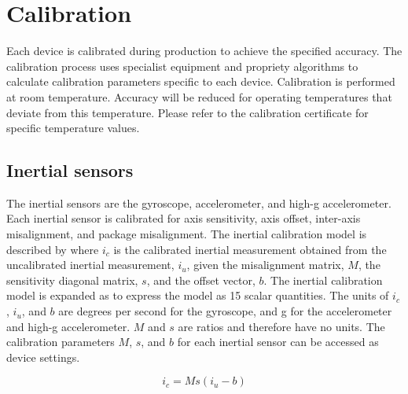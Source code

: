 \section{Calibration}
\label{sec:calibration}

Each device is calibrated during production to achieve the specified accuracy.  The calibration process uses specialist equipment and propriety algorithms to calculate calibration parameters specific to each device.
 Calibration is performed at room temperature.  Accuracy will be reduced for operating temperatures that deviate from this temperature.  Please refer to the calibration certificate for specific temperature values.

\subsection{Inertial sensors}
\label{sec:inertialSensor}

The inertial sensors are the gyroscope, accelerometer, and high-g accelerometer.  Each inertial sensor is calibrated for axis sensitivity, axis offset, inter-axis misalignment, and package misalignment.  The inertial calibration model is described by  where $i_c$ is the calibrated inertial measurement obtained from the uncalibrated inertial measurement, $i_u$, given the misalignment matrix, $M$, the sensitivity diagonal matrix, $s$, and the offset vector, $b$.  The inertial calibration model is expanded as  to express the model as 15 scalar quantities.  The units of $i_c$, $i_u$, and $b$ are degrees per second for the gyroscope, and g for the accelerometer and high-g accelerometer.  $M$ and $s$ are ratios and therefore have no units.  The calibration parameters $M$, $s$, and $b$ for each inertial sensor can be accessed as device settings.

\begin{equation}
\label{eq:inertial}
i_c = M s (i_u - b)
\end{equation}

